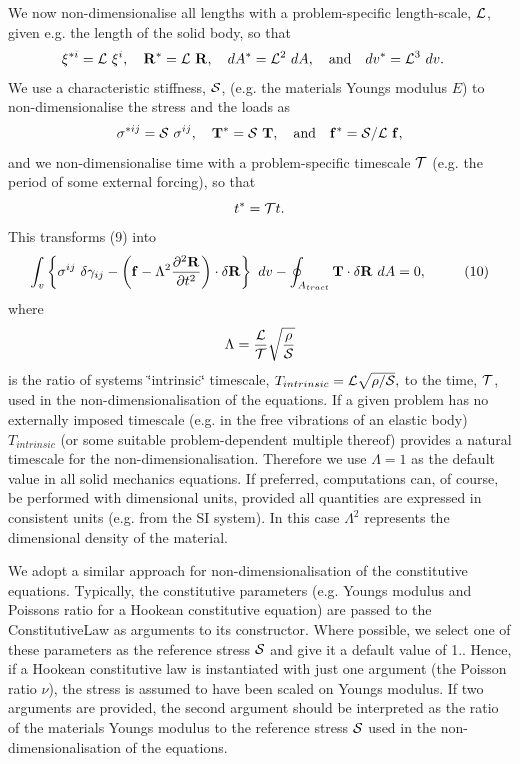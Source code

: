 We now non-\/dimensionalise all lengths with a problem-\/specific length-\/scale, $ {\cal L}$, given e.\+g. the length of the solid body, so that \[ \xi^{*i} = {\cal L} \ \xi^{i}, \ \ \ {\bf R}^* = {\cal L} \ {\bf R}, \ \ \ dA^* = {\cal L}^2 \ dA, \mbox{ \ \ and \ \ } dv^* = {\cal L}^3 \ dv.\ \ \ \] We use a characteristic stiffness, $ {\cal S}$, (e.\+g. the material\textquotesingle{}s Young\textquotesingle{}s modulus $ E $) to non-\/dimensionalise the stress and the loads as \[ \sigma^{*ij} = {\cal S} \ \sigma^{ij}, \ \ \ {\bf T}^* = {\cal S}\ {\bf T}, \mbox{ \ \ and \ \ } {\bf f}^* = {\cal S} / {\cal L} \ {\bf f}, \] and we non-\/dimensionalise time with a problem-\/specific timescale $ {\cal T}$ (e.\+g. the period of some external forcing), so that \[ t^* = {\cal T} t. \] This transforms (9) into \[ \int_{v} \left\{ \sigma^{ij} \ \delta \gamma_{ij} - \left( {\bf f} - \Lambda^2 \frac{\partial^2 {\bf R}}{\partial t^{2}} \right) \cdot \delta {\bf R} \right\} \ dv -\oint_{A_{tract}} {\bf T} \cdot \delta {\bf R} \ dA =0, \ \ \ \ \ \ \ \ (10) \] where \[ \Lambda = \frac{{\cal L}}{\cal T} \sqrt{\frac{\rho}{\cal S}} \] is the ratio of system\textquotesingle{}s \char`\"{}intrinsic\char`\"{} timescale, $T_{intrinsic} = {\cal L} \sqrt{\rho /{\cal S}},$ to the time, ${\cal T}$, used in the non-\/dimensionalisation of the equations. If a given problem has no externally imposed timescale (e.\+g. in the free vibrations of an elastic body) $T_{intrinsic}$ (or some suitable problem-\/dependent multiple thereof) provides a natural timescale for the non-\/dimensionalisation. Therefore we use $ \Lambda=1 $ as the default value in all solid mechanics equations. If preferred, computations can, of course, be performed with dimensional units, provided all quantities are expressed in consistent units (e.\+g. from the SI system). In this case $ \Lambda^2 $ represents the dimensional density of the material.

We adopt a similar approach for non-\/dimensionalisation of the constitutive equations. Typically, the constitutive parameters (e.\+g. Young\textquotesingle{}s modulus and Poisson\textquotesingle{}s ratio for a Hookean constitutive equation) are passed to the {\ttfamily Constitutive\+Law} as arguments to its constructor. Where possible, we select one of these parameters as the reference stress $ {\cal S} $ and give it a default value of 1.. Hence, if a Hookean constitutive law is instantiated with just one argument (the Poisson ratio $ \nu $), the stress is assumed to have been scaled on Young\textquotesingle{}s modulus. If two arguments are provided, the second argument should be interpreted as the ratio of the material\textquotesingle{}s Young\textquotesingle{}s modulus to the reference stress $ {\cal S} $ used in the non-\/dimensionalisation of the equations.



